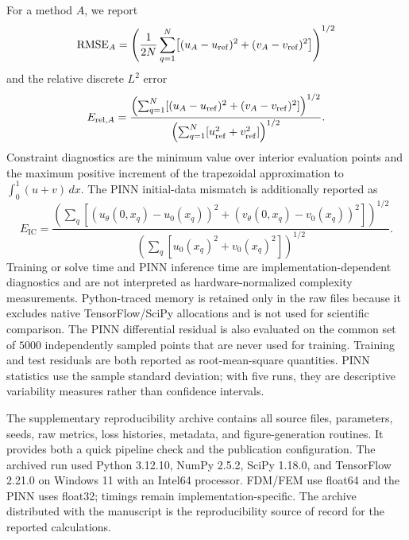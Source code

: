 For a method $A$, we report
\[
 \operatorname{RMSE}_A=\left(\frac1{2N}\sum_{q=1}^{N}
 \bigl[(u_A-u_{\rm ref})^2+(v_A-v_{\rm ref})^2\bigr]\right)^{1/2}
\]
and the relative discrete $L^2$ error
\[
 E_{\mathrm{rel},A}=\frac{\left(\sum_{q=1}^{N}[(u_A-u_{\rm ref})^2+(v_A-v_{\rm ref})^2]\right)^{1/2}}{\left(\sum_{q=1}^{N}[u_{\rm ref}^2+v_{\rm ref}^2]\right)^{1/2}}.
\]
Constraint diagnostics are the minimum value over interior evaluation points and the maximum positive increment of the trapezoidal approximation to $\int_0^1(u+v)\,dx$. The PINN initial-data mismatch is additionally reported as
\[
E_{\mathrm{IC}}=\frac{\left(\sum_q[(u_\theta(0,x_q)-u_0(x_q))^2+(v_\theta(0,x_q)-v_0(x_q))^2]\right)^{1/2}}{\left(\sum_q[u_0(x_q)^2+v_0(x_q)^2]\right)^{1/2}}.
\] Training or solve time and PINN inference time are implementation-dependent diagnostics and are not interpreted as hardware-normalized complexity measurements. Python-traced memory is retained only in the raw files because it excludes native TensorFlow/SciPy allocations and is not used for scientific comparison. The PINN differential residual is also evaluated on the common set of $5000$ independently sampled points that are never used for training. Training and test residuals are both reported as root-mean-square quantities. PINN statistics use the sample standard deviation; with five runs, they are descriptive variability measures rather than confidence intervals.

The supplementary reproducibility archive contains all source files, parameters, seeds, raw metrics, loss histories, metadata, and figure-generation routines. It provides both a quick pipeline check and the publication configuration. The archived run used Python 3.12.10, NumPy 2.5.2, SciPy 1.18.0, and TensorFlow 2.21.0 on Windows 11 with an Intel64 processor. FDM/FEM use float64 and the PINN uses float32; timings remain implementation-specific. The archive distributed with the manuscript is the reproducibility source of record for the reported calculations.